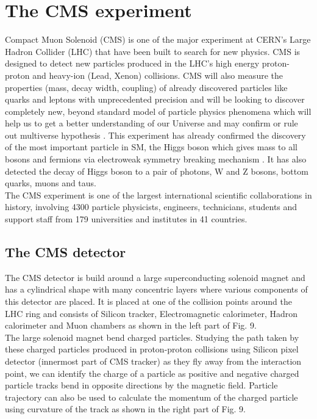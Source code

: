 \section{The CMS experiment}
\label{sec:cms}

\onehalfspacing Compact Muon Solenoid (CMS) is one of the major experiment at CERN's Large Hadron Collider (LHC) that have been built to search for new physics. CMS is designed to detect new particles produced in the LHC's high energy proton-proton and heavy-ion (Lead, Xenon) collisions. CMS will also measure the properties (mass, decay width, coupling) of already discovered particles like quarks and leptons with unprecedented precision and will be looking to discover completely new, beyond standard model of particle physics phenomena which will help us to get a better understanding of our Universe and may confirm or rule out multiverse hypothesis \cite{Chatrchyan:1129810}. This experiment has already confirmed the discovery of the most important particle in SM, the Higgs boson which gives mass to all bosons and fermions via electroweak symmetry breaking mechanism \cite{Chatrchyan:2012xdj}. It has also detected the decay of Higgs boson to a pair of photons, W and Z bosons, bottom quarks, muons and taus.  \\

The CMS experiment is one of the largest international scientific collaborations in history, involving 4300 particle physicists, engineers, technicians, students and support staff from 179 universities and institutes in 41 countries. \\

\subsection{The CMS detector}


The CMS detector is build around a large superconducting solenoid magnet and has a cylindrical shape with many concentric layers where various components of this detector are placed. It is placed at one of the collision points around the LHC ring and consists of Silicon tracker, Electromagnetic calorimeter, Hadron calorimeter and Muon chambers as shown in the left part of Fig. 9. \\

The large solenoid magnet bend charged particles. Studying the path taken by these charged particles produced in proton-proton collisions using Silicon pixel detector (innermost part of CMS tracker) as they fly away from the interaction point, we can identify the charge of a particle as positive and negative charged particle tracks bend in opposite directions by the magnetic field. Particle trajectory can also be used to calculate the momentum of the charged particle using curvature of the track as shown in the right part of Fig. 9. \\

